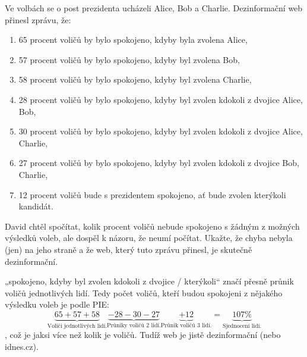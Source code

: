 \documentclass[12pt]{article}					%
\begin{document}
\begin{priklad}[2]
    Ve volbách se o post prezidenta ucházeli Alice, Bob a Charlie. Dezinformační web přinesl zprávu, že:

    \begin{enumerate}
        \item 65 procent voličů by bylo spokojeno, kdyby byla zvolena Alice,
        \item 57 procent voličů by bylo spokojeno, kdyby byl zvolena Bob,
        \item 58 procent voličů by bylo spokojeno, kdyby byl zvolena Charlie,
        \item 28 procent voličů by bylo spokojeno, kdyby byl zvolen kdokoli z dvojice Alice, Bob,
        \item 30 procent voličů by bylo spokojeno, kdyby byl zvolen kdokoli z dvojice Alice, Charlie,
        \item 27 procent voličů by bylo spokojeno, kdyby byl zvolen kdokoli z dvojice Bob, Charlie,
        \item 12 procent voličů bude s prezidentem spokojeno, ať bude zvolen kterýkoli kandidát.
    \end{enumerate}

    David chtěl spočítat, kolik procent voličů nebude spokojeno s žádným z možných výsledků voleb, ale dospěl k názoru, že neumí počítat. Ukažte, že chyba nebyla (jen) na jeho straně a že web, který tuto zprávu přinesl, je skutečně dezinformační. 


    \begin{reseni}
        „spokojeno, kdyby byl zvolen kdokoli z dvojice / kterýkoli“ značí přesně průnik voličů jednotlivých lidí. Tedy počet voličů, kteří budou spokojeni z nějakého výsledku voleb je podle PIE: $$\underbrace{65 + 57 + 58}_\text{Voliči jednotlivých lidí.} \underbrace{- 28 - 30 - 27}_\text{Průniky voličů 2 lidí.} \underbrace{+ 12}_\text{Průnik voličů 3 lidí.} = \underbrace{107\%}_\text{Sjednocení lidí.}$$, což je jaksi více než kolik je voličů. Tudíž web je jistě dezinformační (nebo idnes.cz).
    \end{reseni}
\end{priklad}

\pagebreak
\end{document}
